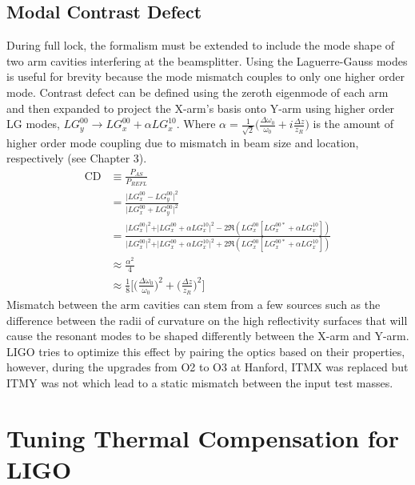 	\subsection{Modal Contrast Defect}
	During full lock, the formalism must be extended to include the mode shape of two arm cavities interfering at the beamsplitter. Using the Laguerre-Gauss modes is useful for brevity because the mode mismatch couples to only one higher order mode. Contrast defect can be defined using the zeroth eigenmode of each arm and then expanded to project the X-arm's basis onto Y-arm using higher order LG modes, $LG^{00}_y \rightarrow  LG^{00}_x + \alpha LG^{10}_x$.  Where $\alpha = \frac{1}{\sqrt{2}} \big(\frac{\Delta \omega_{0}}{\omega_{0}} + i \frac{\Delta z }{z_R}\big)$ is the amount of higher order mode coupling due to mismatch in beam size and location, respectively (see Chapter 3).
	\begin{equation}\label{CD_mode}
	\begin{aligned}
	\text{CD} 	&\equiv \frac{P_{AS}}{P_{REFL}} \\
	&= \frac{\vert LG^{00}_x - LG^{00}_y \vert^2}{\vert LG^{00}_x + LG^{00}_y \vert^2}\\
	&= \frac{\vert LG^{00}_x \vert^2 + \vert LG^{00}_x + \alpha LG^{10}_x \vert^2 - 2\Re(LG^{00}_x [LG^{00*}_x + \alpha LG^{10}_x ])}{\vert LG^{00}_x \vert^2 + \vert LG^{00}_x + \alpha LG^{10}_x \vert^2 + 2\Re(LG^{00}_x [LG^{00*}_x + \alpha LG^{10}_x ])}\\
	&\approx \frac{\alpha^2}{4}\\
	&\approx \frac{1}{8} \bigg[ \bigg(\frac{\Delta\omega_{0}}{\omega_{0}} \bigg)^2+  \bigg(\frac{ \Delta z }{z_R}\bigg)^2 \bigg]
	\end{aligned}
	\end{equation}
	Mismatch between the arm cavities can stem from a few sources such as the difference between the radii of curvature on the high reflectivity surfaces that will cause the resonant modes to be shaped differently between the X-arm and Y-arm. LIGO tries to optimize this effect by pairing the optics based on their properties, however, during the upgrades from O2 to O3 at Hanford, ITMX was replaced but ITMY was not which lead to a static mismatch between the input test masses.
	
	\section{Tuning Thermal Compensation for LIGO}
	
